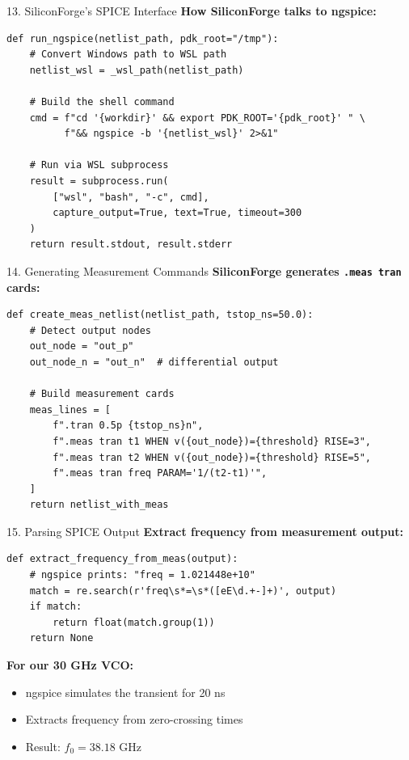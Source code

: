 \documentclass[aspectratio=169, 11pt]{beamer}
\begin{document}
\begin{frame}{13. SiliconForge's SPICE Interface}
    \textbf{How SiliconForge talks to ngspice:}

    \vspace{0.5em}
    \begin{lstlisting}
def run_ngspice(netlist_path, pdk_root="/tmp"):
    # Convert Windows path to WSL path
    netlist_wsl = _wsl_path(netlist_path)
    
    # Build the shell command
    cmd = f"cd '{workdir}' && export PDK_ROOT='{pdk_root}' " \
          f"&& ngspice -b '{netlist_wsl}' 2>&1"
    
    # Run via WSL subprocess
    result = subprocess.run(
        ["wsl", "bash", "-c", cmd],
        capture_output=True, text=True, timeout=300
    )
    return result.stdout, result.stderr
    \end{lstlisting}
\end{frame}

\begin{frame}{14. Generating Measurement Commands}
    \textbf{SiliconForge generates \texttt{.meas tran} cards:}

    \vspace{0.5em}
    \begin{lstlisting}
def create_meas_netlist(netlist_path, tstop_ns=50.0):
    # Detect output nodes
    out_node = "out_p"
    out_node_n = "out_n"  # differential output

    # Build measurement cards
    meas_lines = [
        f".tran 0.5p {tstop_ns}n",
        f".meas tran t1 WHEN v({out_node})={threshold} RISE=3",
        f".meas tran t2 WHEN v({out_node})={threshold} RISE=5",
        f".meas tran freq PARAM='1/(t2-t1)'",
    ]
    return netlist_with_meas
    \end{lstlisting}
\end{frame}

\begin{frame}{15. Parsing SPICE Output}
    \textbf{Extract frequency from measurement output:}

    \vspace{0.5em}
    \begin{lstlisting}
def extract_frequency_from_meas(output):
    # ngspice prints: "freq = 1.021448e+10"
    match = re.search(r'freq\s*=\s*([eE\d.+-]+)', output)
    if match:
        return float(match.group(1))
    return None
    \end{lstlisting}

    \vspace{0.5em}
    \textbf{For our 30 GHz VCO:}
    \begin{itemize}
        \item ngspice simulates the transient for 20 ns
        \item Extracts frequency from zero-crossing times
        \item Result: $f_0 = 38.18$ GHz
    \end{itemize}
\end{frame}
\end{document}
